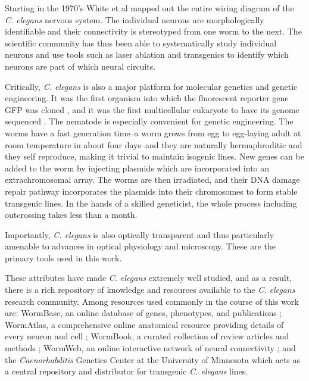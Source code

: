 Starting in the 1970's White et al \citep{white_structure_1976, white_structure_1986}  mapped out the entire wiring diagram of the \textit{C. elegans} nervous system. The individual neurons are morphologically identifiable and their connectivity is stereotyped from one worm to the next. The  scientific community has thus been able to systematically study individual neurons and use tools such as laser ablation and transgenics to identify which neurons are part of which neural circuits. 

Critically, \textit{C. elegans} is also a major platform for molecular genetics and genetic engineering. It was the first organism into which the fluorescent reporter gene GFP was cloned \citep{chalfie_green_1994},  and it was the first multicellular eukaryote to have its genome sequenced \citep{sulston_c._1992,_genome_1998}. The nematode is especially convenient for genetic engineering. The worms have a fast generation time--a worm grows from egg to egg-laying adult at room temperature in about four days--and they are naturally hermaphroditic and they self reproduce,  making it trivial to maintain isogenic lines. New genes can be added to the worm by injecting plasmids which are incorporated into an extrachromosomal array. The worms are then irradiated, and their DNA damage repair pathway incorporates the plasmids into their chromosomes to form stable transgenic lines.  In the hands of a skilled geneticist, the whole process including outcrossing takes less than a month. 

Importantly, \textit{C. elegans} is also optically transparent and thus particularly amenable to advances in optical physiology and microscopy. These are the primary tools used in this work. 

These attributes have made  \textit{C. elegans}  extremely well studied, and as a result, there is a rich repository of knowledge and resources available to the \textit{C. elegans} research community. Among resources used commonly in the course of this work are:  WormBase, an online database of genes, phenotypes, and publications \citep{harris_wormbase:_2010}; WormAtlas, a comprehensive online anatomical resource providing details of every neuron and cell \citep{altun_wormatlas_2002}; WormBook, a curated collection of review articles and methods \citep{the_c._elegans_research_community_wormbook_2011}; WormWeb, an online interactive network of neural connectivity \citep{bhatla_c._2009};  and the \textit{Caenorhabditis} Genetics Center at the University of Minnesota which acts as a central repository and distributor for transgenic \textit{C. elegans} lines.


